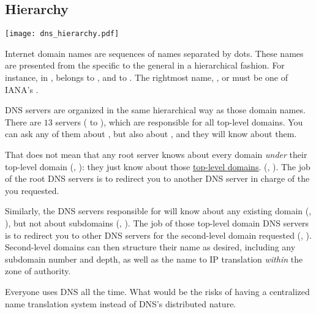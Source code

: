 \subsection{Hierarchy}\label{sec:layer6:dns:hierarchy}

\begin{center}
\texttt{[image: dns\_hierarchy.pdf]}
\end{center}

Internet domain names are sequences of names separated by dots. 
These names are presented from the specific to the general in a hierarchical fashion.
For instance, in ,  belongs to ,
and  to .
% 
The rightmost name, \eg,  or  
must be one of IANA's .

DNS servers are organized in the same hierarchical way as those domain names.
There are $13$  servers ( to ),
which are responsible for all top-level domains.
You can ask any of them about , 
but also about , and they will know about them.

That does not mean that any root server knows about every domain \textit{under}
their top-level domain (\eg, ): they just know about those 
\href{https://en.wikipedia.org/wiki/List_of_Internet_top-level_domains}{\underline{top-level domains}}.
(\eg, ).
% 
The job of the root DNS servers is to redirect you to another DNS server in charge 
of the  you requested.
 
Similarly, the DNS servers responsible for  will know about 
any existing  domain (\eg, ), 
but not about subdomains (\eg, ). 
% 
The job of those top-level domain DNS servers is to redirect you to 
other DNS servers  for the second-level domain 
requested (\eg, ).
% 
Second-level domains can then structure their name  
as desired, including any subdomain number and depth, as well as
the name to IP translation \textit{within} the zone of authority.

\begin{exercise}
Everyone uses DNS all the time. What would be the risks of having
a centralized name translation system instead of DNS's distributed nature.
\end{exercise}

